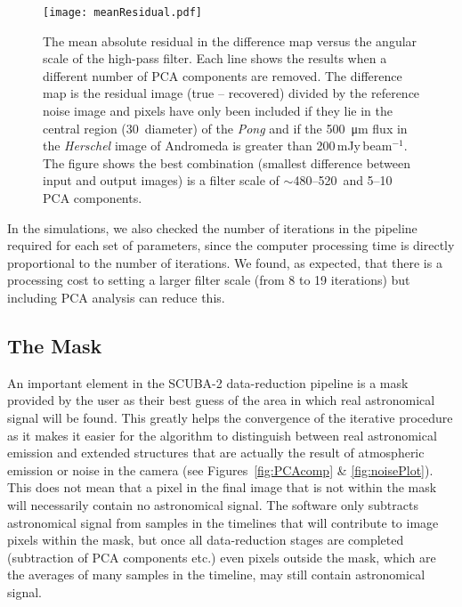 \documentclass[a4paper,fleqn,usenatbib, twocolumn]{aastex63}
\begin{document}
\begin{figure}
  \centering
  \texttt{[image: meanResidual.pdf]}
  \caption{The mean absolute residual in the difference map versus the
  angular scale of the high-pass filter. Each line shows the results when a different
  number of PCA components are removed. The difference map is the residual image
  (true -- recovered) divided by the reference noise image and pixels
  have only been included if they lie in the central region (30\arcmin\ diameter)
  of the {\it Pong} and if the \SI{500}{\micro\meter} flux in the {\it Herschel} image
  of Andromeda \citep{smith2012} is greater than 200\,mJy\,beam$^{-1}$.
  The figure shows the best combination (smallest difference between input
  and output images) is a filter scale of $\sim$480--520\arcsec\ and
  5--10 PCA components.
  }
  \label{fig:meanResidual}
\end{figure}


In the simulations, we also checked the number of iterations in the pipeline
required for each set of parameters, since the computer processing time
is directly proportional to the number of iterations. We found, as expected,
that there is a processing cost to setting a larger filter scale (from 8 to 19 iterations)
but including PCA analysis can reduce this.

\subsection{The Mask}
\label{sec:maskSim}

An important element in the SCUBA-2 data-reduction pipeline is a mask
provided by the user as their best guess of the area in which real
astronomical signal will be found. This greatly helps the convergence
of the iterative procedure as it makes it easier for the algorithm
to distinguish between real astronomical emission and extended structures
that are actually the result of atmospheric emission or noise in the
camera (see Figures~\ref{fig:PCAcomp} \& \ref{fig:noisePlot}).
This does not mean that a pixel in the final image that is not within the mask will
necessarily contain no astronomical signal. The software only subtracts astronomical
signal from samples in the timelines that will contribute to
image pixels within the mask, but once
all data-reduction stages are completed (subtraction of PCA
components etc.) even pixels outside the mask, which are the averages
of many samples in the timeline, may still contain astronomical signal.
\end{document}
